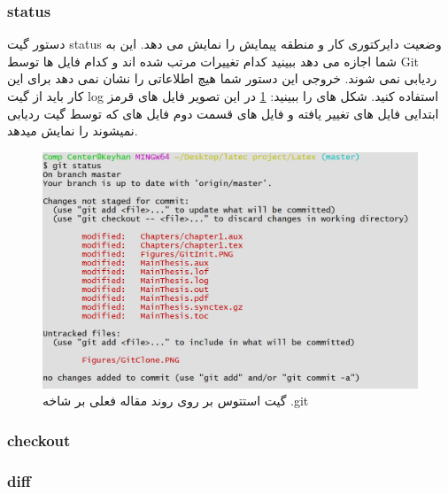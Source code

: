 \subsubsection{status}
دستور گیت status  وضعیت دایرکتوری کار و منطقه پیمایش را نمایش می دهد. این به شما اجازه می دهد ببینید کدام تغییرات مرتب شده اند و کدام فایل ها توسط Git ردیابی نمی شوند. خروجی این دستور شما هیچ اطلاعاتی را نشان نمی دهد برای این کار باید از گیت log استفاده کنید. شکل های را ببینید: \ref{Fig:GitStatus} در این تصویر فایل های قرمز ابتدایی فایل های تغییر یافته و فایل های قسمت دوم فایل های که توسط گیت ردیابی نمیشوند را نمایش میدهد.  
\begin{figure}[tbh]
	\centering
	\includegraphics[width=1\textwidth]{./Figures/GitStatus}
	\caption{ گیت استتوس بر روی روند مقاله فعلی بر شاخه .git }
	\label{Fig:GitStatus}
\end{figure}
 
\subsubsection{checkout}

\subsubsection{diff}